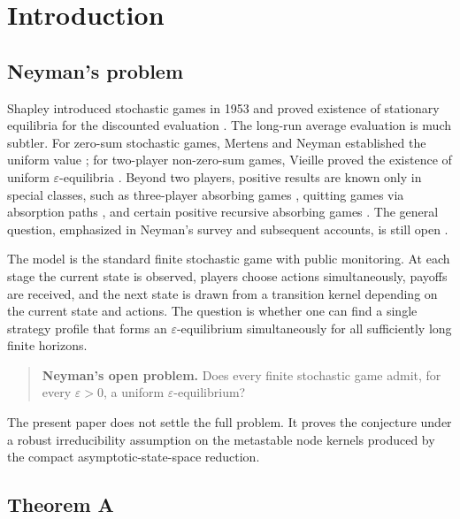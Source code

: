 \documentclass[12pt]{article}
\theoremstyle{definition}
\newcommand{\eps}{\varepsilon}
\newcommand{\1}{\mathbf{1}}
\begin{document}
\tableofcontents

\section{Introduction}

\subsection{Neyman's problem}

Shapley introduced stochastic games in 1953 and proved existence of stationary equilibria
for the discounted evaluation \cite{Shapley1953}.  The long-run average evaluation is
much subtler.  For zero-sum stochastic games, Mertens and Neyman established the uniform
value \cite{MertensNeyman1981}; for two-player non-zero-sum games, Vieille proved the
existence of uniform $\eps$-equilibria \cite{Vieille2000I,Vieille2000II}.  Beyond two
players, positive results are known only in special classes, such as three-player
absorbing games \cite{Solan1999}, quitting games via absorption paths
\cite{AshkenaziGolanKrasikovRainerSolan2024}, and certain positive recursive absorbing
games \cite{SolanVieille2025}.  The general question, emphasized in Neyman's survey and
subsequent accounts, is still open \cite{Solan2003,MertensSorinZamir2003}.

The model is the standard finite stochastic game with public monitoring.  At each stage
the current state is observed, players choose actions simultaneously, payoffs are
received, and the next state is drawn from a transition kernel depending on the current
state and actions.  The question is whether one can find a single strategy profile that
forms an $\eps$-equilibrium simultaneously for all sufficiently long finite horizons.

\begin{quote}
\textbf{Neyman's open problem.}
Does every finite stochastic game admit, for every $\eps>0$, a uniform
$\eps$-equilibrium?
\end{quote}

The present paper does not settle the full problem.  It proves the conjecture under a
robust irreducibility assumption on the metastable node kernels produced by the compact
asymptotic-state-space reduction.

\subsection{Theorem A}
\end{document}
